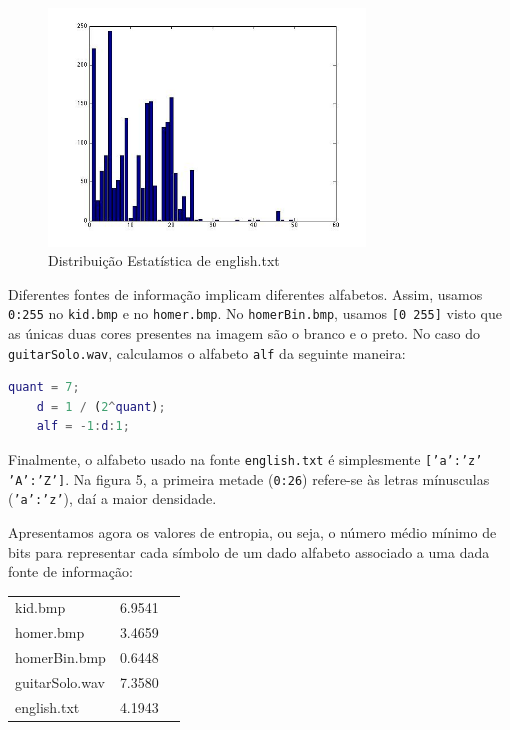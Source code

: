 \documentclass[12pt]{article}
\begin{document}
  \begin{figure}[H]
    \centering
      \includegraphics[width=0.75\textwidth]{ex3english}
    \caption{Distribuição Estatística de english.txt}
  \end{figure}

  Diferentes fontes de informação implicam diferentes alfabetos. Assim, usamos
  \texttt{0:255} no \texttt{kid.bmp} e no \texttt{homer.bmp}. No \texttt{homerBin.bmp},
  usamos \texttt{[0 255]} visto que as únicas duas cores presentes na imagem
  são o branco e o preto. No caso do \texttt{guitarSolo.wav}, calculamos o alfabeto
  \texttt{alf} da seguinte maneira:

  \vspace{2mm}
  \begin{lstlisting}[language=Matlab]
    quant = 7;
    d = 1 / (2^quant);
    alf = -1:d:1;
  \end{lstlisting}

  Finalmente, o alfabeto usado na fonte \texttt{english.txt} é simplesmente
  \texttt{['a':'z' 'A':'Z']}. Na figura 5, a primeira metade (\texttt{0:26})
  refere-se às letras mínusculas (\texttt{'a':'z'}), daí a maior densidade.

  Apresentamos agora os valores de entropia, ou seja, o número médio mínimo
  de bits para representar cada símbolo de um dado alfabeto associado a uma
  dada fonte de informação:

  \begin{tabular}{ l c r }
    kid.bmp & 6.9541 \\
    homer.bmp & 3.4659 \\
    homerBin.bmp & 0.6448 \\
    guitarSolo.wav & 7.3580 \\
    english.txt & 4.1943 \\
  \end{tabular}
\end{document}
